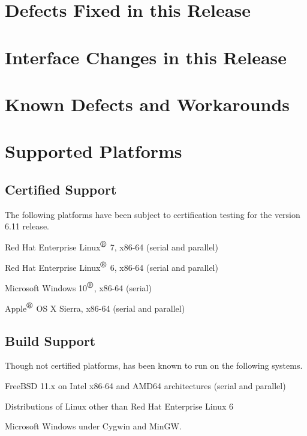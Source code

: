 \documentclass[letterpaper]{scrartcl}
\begin{document}
\newpage
\section{Defects Fixed in this Release}



\newpage
\section{Interface Changes in this Release}



\newpage
\section{Known Defects and Workarounds}



\newpage
\section{Supported Platforms}
\subsection*{Certified Support}
The following platforms have been subject to certification testing for the
\Xyce{} version 6.11 release.
\begin{XyceItemize}
  \item Red Hat Enterprise Linux${}^{\mbox{\textregistered}}$ 7, x86-64 (serial and parallel)
  \item Red Hat Enterprise Linux${}^{\mbox{\textregistered}}$ 6, x86-64 (serial and parallel)
  \item Microsoft Windows 10${}^{\mbox{\textregistered}}$, x86-64 (serial)
  \item Apple${}^{\mbox{\textregistered}}$ OS X Sierra, x86-64 (serial and parallel)
\end{XyceItemize}

\subsection*{Build Support}
Though not certified platforms, \Xyce{} has been known to run on the following
systems.
\begin{XyceItemize}
  \item FreeBSD 11.x on Intel x86-64 and AMD64 architectures (serial
    and parallel)
  \item Distributions of Linux other than Red Hat Enterprise Linux 6
  \item Microsoft Windows under Cygwin and MinGW.
\end{XyceItemize}
\end{document}

